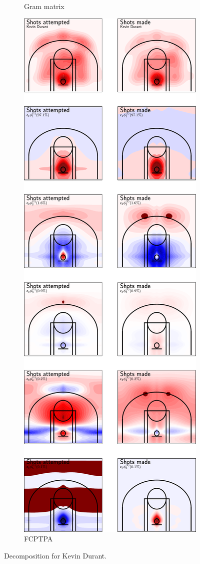 \begin{figure}
\begin{subfigure}[b]{0.45\textwidth}
        \caption{Gram matrix}
        \label{fig:durant_decomposition}
    \end{subfigure}
    \hfill
    \begin{subfigure}[b]{0.45\textwidth}
        \centering
        \includegraphics[width=\textwidth]{figures/durant_decomposition_fcptpa.pdf}
        \caption{FCPTPA}
        \label{fig:durant_decomposition_fcptpa}
    \end{subfigure}
    \caption{Decomposition for Kevin Durant.}
    \label{fig:durant_shoots_decomposition}
\end{figure}


